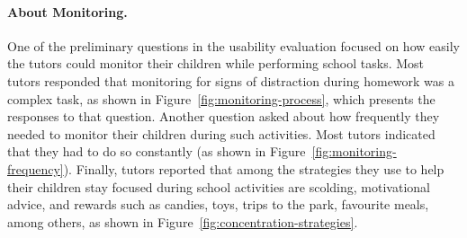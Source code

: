                 \paragraph{About Monitoring.}
                One of the preliminary questions in the usability evaluation focused on how easily the tutors could monitor their children while performing school tasks. Most tutors responded that monitoring for signs of distraction during homework was a complex task, as shown in Figure~\ref{fig:monitoring-process}, which presents the responses to that question. Another question asked about how frequently they needed to monitor their children during such activities. Most tutors indicated that they had to do so constantly (as shown in Figure~\ref{fig:monitoring-frequency}). Finally, tutors reported that among the strategies they use to help their children stay focused during school activities are scolding, motivational advice, and rewards such as candies, toys, trips to the park, favourite meals, among others, as shown in Figure~\ref{fig:concentration-strategies}.
                
